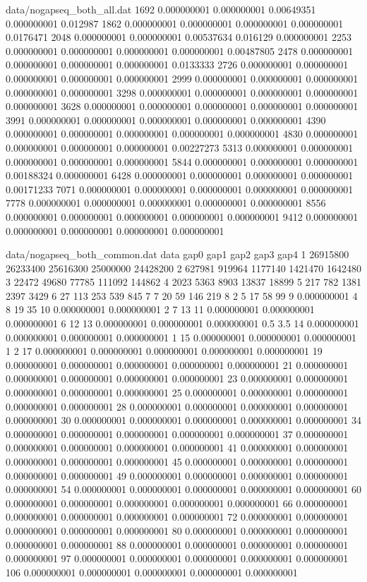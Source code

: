 \begin{filecontents}{data/nogapseq_both_all.dat}
1692	0.000000001	0.000000001	0.00649351	0.000000001	0.012987
1862	0.000000001	0.000000001	0.000000001	0.000000001	0.0176471
2048	0.000000001	0.000000001	0.00537634	0.016129	0.000000001
2253	0.000000001	0.000000001	0.000000001	0.000000001	0.00487805
2478	0.000000001	0.000000001	0.000000001	0.000000001	0.0133333
2726	0.000000001	0.000000001	0.000000001	0.000000001	0.000000001
2999	0.000000001	0.000000001	0.000000001	0.000000001	0.000000001
3298	0.000000001	0.000000001	0.000000001	0.000000001	0.000000001
3628	0.000000001	0.000000001	0.000000001	0.000000001	0.000000001
3991	0.000000001	0.000000001	0.000000001	0.000000001	0.000000001
4390	0.000000001	0.000000001	0.000000001	0.000000001	0.000000001
4830	0.000000001	0.000000001	0.000000001	0.000000001	0.00227273
5313	0.000000001	0.000000001	0.000000001	0.000000001	0.000000001
5844	0.000000001	0.000000001	0.000000001	0.00188324	0.000000001
6428	0.000000001	0.000000001	0.000000001	0.000000001	0.00171233
7071	0.000000001	0.000000001	0.000000001	0.000000001	0.000000001
7778	0.000000001	0.000000001	0.000000001	0.000000001	0.000000001
8556	0.000000001	0.000000001	0.000000001	0.000000001	0.000000001
9412	0.000000001	0.000000001	0.000000001	0.000000001	0.000000001

\end{filecontents}

\begin{filecontents}{data/nogapseq_both_common.dat}
data	gap0	gap1	gap2	gap3	gap4
1	26915800	26233400	25616300	25000000	24428200
2	627981	919964	1177140	1421470	1642480
3	22472	49680	77785	111092	144862
4	2023	5363	8903	13837	18899
5	217	782	1381	2397	3429
6	27	113	253	539	845
7	7	20	59	146	219
8	2	5	17	58	99
9	0.000000001	4	8	19	35
10	0.000000001	0.000000001	2	7	13
11	0.000000001	0.000000001	0.000000001	6	12
13	0.000000001	0.000000001	0.000000001	0.5	3.5
14	0.000000001	0.000000001	0.000000001	0.000000001	1
15	0.000000001	0.000000001	0.000000001	1	2
17	0.000000001	0.000000001	0.000000001	0.000000001	0.000000001
19	0.000000001	0.000000001	0.000000001	0.000000001	0.000000001
21	0.000000001	0.000000001	0.000000001	0.000000001	0.000000001
23	0.000000001	0.000000001	0.000000001	0.000000001	0.000000001
25	0.000000001	0.000000001	0.000000001	0.000000001	0.000000001
28	0.000000001	0.000000001	0.000000001	0.000000001	0.000000001
30	0.000000001	0.000000001	0.000000001	0.000000001	0.000000001
34	0.000000001	0.000000001	0.000000001	0.000000001	0.000000001
37	0.000000001	0.000000001	0.000000001	0.000000001	0.000000001
41	0.000000001	0.000000001	0.000000001	0.000000001	0.000000001
45	0.000000001	0.000000001	0.000000001	0.000000001	0.000000001
49	0.000000001	0.000000001	0.000000001	0.000000001	0.000000001
54	0.000000001	0.000000001	0.000000001	0.000000001	0.000000001
60	0.000000001	0.000000001	0.000000001	0.000000001	0.000000001
66	0.000000001	0.000000001	0.000000001	0.000000001	0.000000001
72	0.000000001	0.000000001	0.000000001	0.000000001	0.000000001
80	0.000000001	0.000000001	0.000000001	0.000000001	0.000000001
88	0.000000001	0.000000001	0.000000001	0.000000001	0.000000001
97	0.000000001	0.000000001	0.000000001	0.000000001	0.000000001
106	0.000000001	0.000000001	0.000000001	0.000000001	0.000000001
\end{filecontents}

